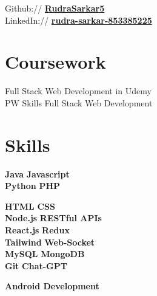 \documentclass{deedy-resume-openfont}
\begin{document}
\begin{minipage}[t]{0.33\textwidth}
Github:// \href{https://github.com/RudraSarkar5}{\bf RudraSarkar5} \\
LinkedIn://  \href{www.linkedin.com/in/rudra-sarkar-853385225}{\bf rudra-sarkar-853385225} \\





\section{Coursework}

Full Stack Web Development in Udemy \\
PW Skills Full Stack Web Development \\

\sectionsep





\section{Skills}


\textbullet{} \textbf{Java} \textbullet{} \textbf{Javascript} \\ \textbullet{} \textbf{Python} 
\textbullet{} \textbf{PHP}   

\textbullet{} \textbf{HTML} \textbullet{} \textbf{CSS}  \\
\textbullet{} \textbf{Node.js} \textbullet{} \textbf{RESTful APIs} \\
\textbullet{} \textbf{React.js} \textbullet{} \textbf{Redux} \\
\textbullet{} \textbf{Tailwind} \textbullet{} \textbf{Web-Socket} \\
\textbullet{} \textbf{MySQL} \textbullet{} \textbf{MongoDB} \\
\textbullet{} \textbf{Git} \textbullet{} \textbf{Chat-GPT} 

 \textbullet{} \textbf{Android Development}
\sectionsep

%
%

\end{minipage} 
\hfill
\end{document}
